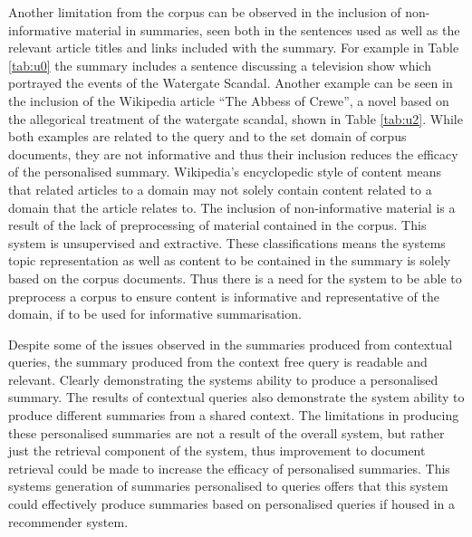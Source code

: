 Another limitation from the corpus can be observed in the inclusion of non-informative material in summaries, seen both in the sentences used as well as the relevant article titles and links included with the summary. For example in Table \ref{tab:u0} the summary includes a sentence discussing a television show which portrayed the events of the Watergate Scandal. Another example can be seen in the inclusion of the Wikipedia article “The Abbess of Crewe”, a novel based on the allegorical treatment of the watergate scandal, shown in Table \ref{tab:u2}. While both examples are related to the query and to the set domain of corpus documents, they are not informative and thus their inclusion reduces the efficacy of the personalised summary. Wikipedia’s encyclopedic style of content means that related articles to a domain may not solely contain content related to a domain that the article relates to. The inclusion of non-informative material is a result of the lack of preprocessing of material contained in the corpus. This system is unsupervised and extractive. These classifications means the systems topic representation as well as content to be contained in the summary is solely based on the corpus documents. Thus there is a need for the system to be able to preprocess a corpus to ensure content is informative and representative of the domain, if to be used for informative summarisation.

Despite some of the issues observed in the summaries produced from contextual queries, the summary produced from the context free query is readable and relevant. Clearly demonstrating the systems ability to produce a personalised summary. The results of contextual queries also demonstrate the system ability to produce different summaries from a shared context. The limitations in producing these personalised summaries are not a result of the overall system, but rather just the retrieval component of the system, thus improvement to document retrieval could be made to increase the efficacy of personalised summaries. This systems generation of summaries personalised to queries offers that this system could effectively produce summaries based on personalised queries if housed in a recommender system. 


